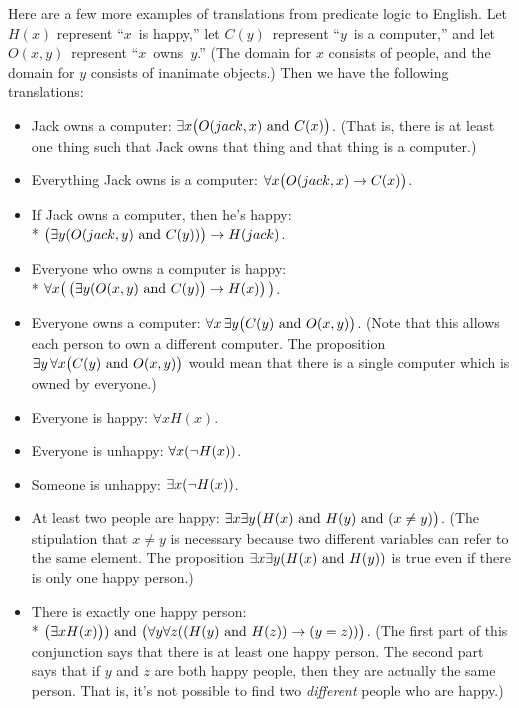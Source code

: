 Here are a few more examples of translations from predicate logic
to English.  Let $H(x)$ represent ``$x$~is happy,'' let
$C(y)$~represent ``$y$~is a computer,'' and let $O(x,y)$~represent
``$x$~owns~$y$.''  (The domain for $x$ consists of 
people, and the domain for $y$ consists of inanimate objects.)
Then we have the following translations:

\begin{itemize}
\setlength{\itemsep}{0pt plus 1 pt}
\setlength{\parsep}{0pt plus 1 pt}
\item Jack owns a computer: $\exists x\big(O(jack,x)\text{ and } C(x)\big)$.
(That is, there is at least one thing such that Jack owns that thing and that thing
is a computer.)
\item Everything Jack owns is a computer: $\forall x\big(O(jack,x)\rightarrow C(x)\big)$.
\item If Jack owns a computer, then he's happy:\\*
\hspace*{0.5in}$\big(\exists y(O(jack,y)\text{ and } C(y))\big)\rightarrow H(jack)$.
\item Everyone who owns a computer is happy:\\*
\hspace*{0.5in} $\forall x\big(\,\big(\exists y(O(x,y)\text{ and } C(y)\big)\rightarrow H(x)\big)\,\big)$.
\item Everyone owns a computer: $\forall x\,\exists y\big(C(y)\text{ and } O(x,y)\big)$.
(Note that this allows each person to own a different computer.
The proposition $\exists y\,\forall x\big(C(y)\text{ and } O(x,y)\big)$
would mean that there is a single computer which is owned by
everyone.)
\item Everyone is happy: $\forall xH(x)$.
\item Everyone is unhappy: $\forall x(\lnot H(x))$.
\item Someone is unhappy: $\exists x(\lnot H(x))$.
\item At least two people are happy:
 $\exists x \exists y\big(H(x) \text{ and } H(y) \text{ and } (x\ne y)\big)$.  (The stipulation
 that $x\ne y$ is necessary because two different variables can refer to
 the same element.  The proposition $\exists x\exists y(H(x)\text{ and } H(y))$ is
 true even if there is only one happy person.)
\item There is exactly one happy person:\\*
 \hspace*{0.5 in}$\big(\exists x H(x)\big)) \text{ and } \big(\forall y \forall z((H(y)\text{ and } H(z))\rightarrow (y=z))\big)$.
 (The first part of this conjunction says that there is at least one happy person.
 The second part says that if $y$ and $z$ are both happy people, then they are actually
 the same person. That is, it's not possible to find two \emph{different} people who
 are happy.)
\end{itemize}

